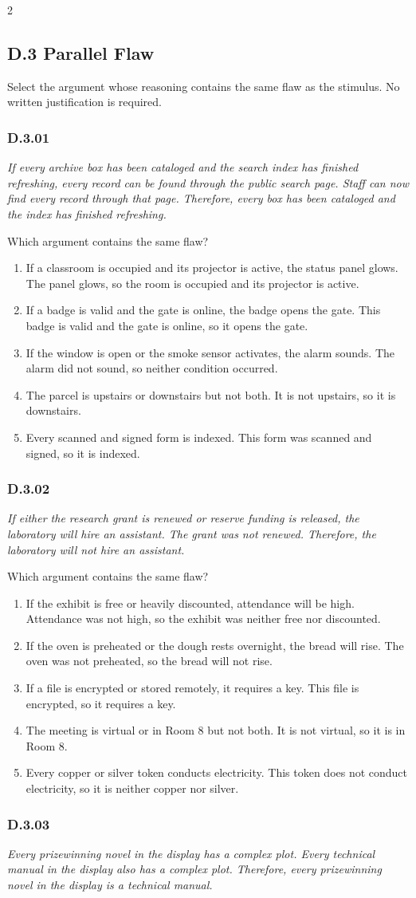 \documentclass[10pt]{extarticle}
\newcommand{\choice}[1]{\item #1}
\newcommand{\bankitem}[1]{\subsubsection*{#1}}
\begin{document}
\begin{multicols}{2}
\subsection*{D.3 Parallel Flaw}
Select the argument whose reasoning contains the same flaw as the stimulus. No written justification is required.
\bankitem{D.3.01}
\emph{If every archive box has been cataloged and the search index has finished refreshing, every record can be found through the public search page. Staff can now find every record through that page. Therefore, every box has been cataloged and the index has finished refreshing.}

Which argument contains the same flaw?
\begin{enumerate}[label=(\alph*)]
  \choice{If a classroom is occupied and its projector is active, the status panel glows. The panel glows, so the room is occupied and its projector is active.}
  \choice{If a badge is valid and the gate is online, the badge opens the gate. This badge is valid and the gate is online, so it opens the gate.}
  \choice{If the window is open or the smoke sensor activates, the alarm sounds. The alarm did not sound, so neither condition occurred.}
  \choice{The parcel is upstairs or downstairs but not both. It is not upstairs, so it is downstairs.}
  \choice{Every scanned and signed form is indexed. This form was scanned and signed, so it is indexed.}
\end{enumerate}
\bankitem{D.3.02}
\emph{If either the research grant is renewed or reserve funding is released, the laboratory will hire an assistant. The grant was not renewed. Therefore, the laboratory will not hire an assistant.}

Which argument contains the same flaw?
\begin{enumerate}[label=(\alph*)]
  \choice{If the exhibit is free or heavily discounted, attendance will be high. Attendance was not high, so the exhibit was neither free nor discounted.}
  \choice{If the oven is preheated or the dough rests overnight, the bread will rise. The oven was not preheated, so the bread will not rise.}
  \choice{If a file is encrypted or stored remotely, it requires a key. This file is encrypted, so it requires a key.}
  \choice{The meeting is virtual or in Room 8 but not both. It is not virtual, so it is in Room 8.}
  \choice{Every copper or silver token conducts electricity. This token does not conduct electricity, so it is neither copper nor silver.}
\end{enumerate}
\bankitem{D.3.03}
\emph{Every prizewinning novel in the display has a complex plot. Every technical manual in the display also has a complex plot. Therefore, every prizewinning novel in the display is a technical manual.}


\end{multicols}
\end{document}
